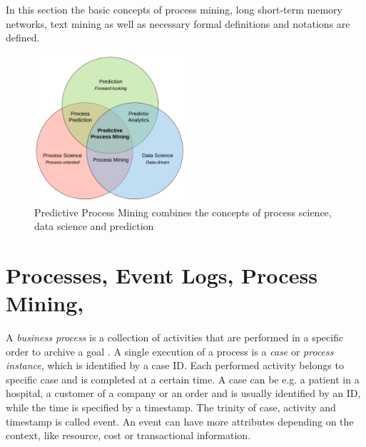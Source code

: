 In this section the basic concepts of process mining, long short-term memory networks, text mining as well as necessary formal definitions and notations are defined.


\begin{figure}
	\centering
	\includegraphics[width=0.5\textwidth]{figures/predictive-process-mining}
	\caption{Predictive Process Mining combines the concepts of process science, data science and prediction}
\end{figure}


\section{Processes, Event Logs, Process Mining, }

A \textit{business process} is a collection of activities that are performed in a specific order to archive a goal \cite{DBLP:conf/bpm/AalstAM11}.
A single execution of a process is a \textit{case} or \textit{process instance}, which is identified by a case ID.
Each performed activity belongs to specific case and is completed at a certain time.
A case can be e.g. a patient in a hospital, a customer of a company or an order and is usually identified by an ID, while 
the time is specified by a timestamp.
The trinity of case, activity and timestamp is called event.
An event can have more attributes depending on the context, like resource, cost or transactional information.

